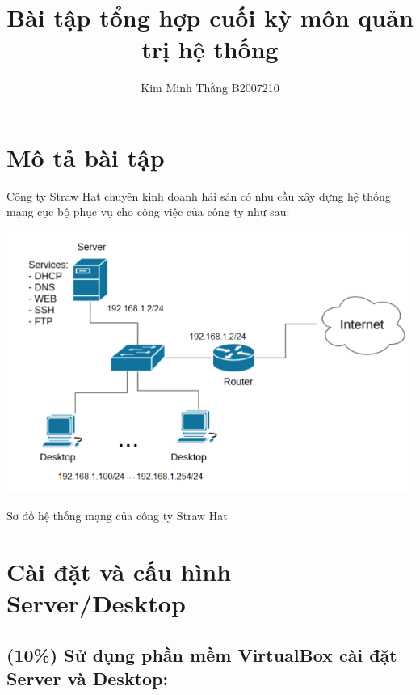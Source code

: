 \documentclass[a4paper, 11pt]{article}
\title{Bài tập tổng hợp cuối kỳ môn quản trị hệ thống}
\author{Kim Minh Thắng B2007210}
\begin{document}
\maketitle
\tableofcontents
\listoffigures
\listoftables
\lstlistoflistings

\newpage

\section*{Mô tả bài tập}

Công ty Straw Hat chuyên kinh doanh hải sản có nhu cầu xây dựng hệ thống mạng cục bộ phục vụ cho công việc của công ty như sau:

\begin{minipage}{\linewidth}
    \captionsetup{type=figure}
    \includegraphics[width=\linewidth]{images/networks.png}
    \caption{Sơ đồ hệ thống mạng của công ty Straw Hat}
\end{minipage}

\section{Cài đặt và cấu hình Server/Desktop}

\subsection{(10\%) Sử dụng phần mềm VirtualBox cài đặt Server và Desktop:}
\end{document}
